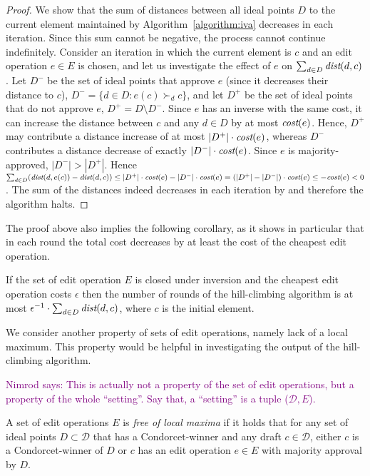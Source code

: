 \documentclass[sigconf]{aamas}  %
\newcommand{\nimrod}[1]{\textcolor{purple}{Nimrod says: #1}}
\newcommand{\calD}{\mathcal{D}}
\newcommand{\prefers}[1]{\succ_{#1}}
\newcommand{\dist}{\emph{dist}}
\newcommand{\cost}{\emph{cost}}
\begin{document}
\begin{proof}
%
We show that the sum of distances between all ideal points $D$ to the current element maintained by Algorithm~\ref{algorithm:iva} decreases in each iteration. Since this sum cannot be negative, the process cannot continue indefinitely. Consider an iteration in which the current element is $c$ and an edit operation $e \in E$ is chosen, and let us investigate the effect of $e$ on $\sum_{d \in D} \dist(d, c)$.
%
Let $D^-$ be the set of ideal points that approve $e$ (since it decreases their distance to $c$), $D^- = \{d \in D: e(c) \prefers{d} c\}$,  and let $D^+$ be the set of ideal points that do not approve $e$, $D^+ = D \setminus D^-$. Since $e$ has an inverse with the same cost, it can increase the distance between $c$ and any $d \in D$ by at most $\cost(e)$.
Hence,  $D^+$ may contribute a distance increase of at most $|D^+| \cdot \cost(e)$, whereas  $D^-$  contributes a distance decrease of exactly $|D^-| \cdot \cost(e)$. 
Since $e$ is majority-approved, $|D^-| > |D^+|$.   Hence  $\sum_{d \in D} (\dist(d, e(c)) -\dist(d,c)) \le |D^+| \cdot \cost(e) -  |D^-| \cdot \cost(e)  = (|D^+| - |D^-|) \cdot \cost(e) \le  -\cost(e) < 0$.  The sum of the distances indeed decreases in each iteration by and therefore the algorithm halts.
%
\end{proof}

The proof above also implies the following corollary, as it shows in particular that in each round the total cost decreases by at least the cost of the cheapest edit operation.

\begin{corollary}
  If the set of edit operation $E$ is closed under inversion and the cheapest edit operation costs $\epsilon$ then the number of rounds of the hill-climbing algorithm is at most $\epsilon^{-1} \cdot \sum_{d \in D} \dist(d, c)$, where $c$ is the initial element. 
\end{corollary}

We consider another property of sets of edit operations, namely lack of a local maximum. This property would be helpful in investigating the output of the hill-climbing algorithm.

\nimrod{This is actually not a property of the set of edit operations, but a property of the whole ``setting''. Say that, a ``setting'' is a tuple ($\calD, E$).}

\begin{definition}
%
A set of edit operations $E$ is \emph{free of local maxima} if it holds that for any set of ideal points $D \subset \calD$ that has a Condorcet-winner and any draft $c \in \calD$, either $c$ is a Condorcet-winner of $D$ or $c$ has an edit operation $e \in E$ with majority approval by $D$.
%
\end{definition}
\end{document}

